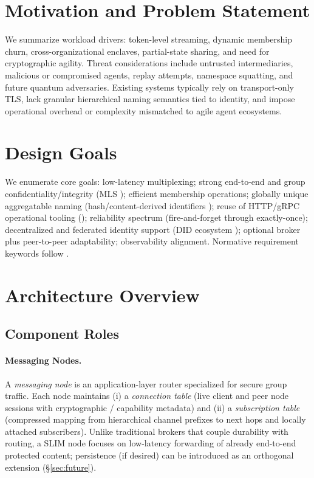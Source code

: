 \documentclass{article}
\theoremstyle{definition}
\theoremstyle{remark}
\begin{document}
\section{Motivation and Problem Statement}\label{sec:motivation}
We summarize workload drivers: token-level streaming, dynamic membership churn, cross-organizational enclaves, partial-state sharing, and need for cryptographic agility. Threat considerations include untrusted intermediaries, malicious or compromised agents, replay attempts, namespace squatting, and future quantum adversaries. Existing systems typically rely on transport-only TLS, lack granular hierarchical naming semantics tied to identity, and impose operational overhead or complexity mismatched to agile agent ecosystems.

\section{Design Goals}\label{sec:goals}
We enumerate core goals: low-latency multiplexing; strong end-to-end and group confidentiality/integrity (MLS \citep{rfc9420}); efficient membership operations; globally unique aggregatable naming (hash/content-derived identifiers \citep{rfc6920}); reuse of HTTP/gRPC operational tooling (\citep{grpc,http2}); reliability spectrum (fire-and-forget through exactly-once); decentralized and federated identity support (DID ecosystem \citep{didcore,didmethods}); optional broker plus peer-to-peer adaptability; observability alignment. Normative requirement keywords follow \citep{rfc2119,rfc8174}.

\section{Architecture Overview}\label{sec:architecture}
\subsection{Component Roles}
\paragraph{Messaging Nodes.} A \emph{messaging node} is an application-layer router specialized for secure group traffic. Each node maintains (i) a \emph{connection table} (live client and peer node sessions with cryptographic / capability metadata) and (ii) a \emph{subscription table} (compressed mapping from hierarchical channel prefixes to next hops and locally attached subscribers). Unlike traditional brokers that couple durability with routing, a SLIM node focuses on low-latency forwarding of already end-to-end protected content; persistence (if desired) can be introduced as an orthogonal extension (\S\ref{sec:future}).
\end{document}
